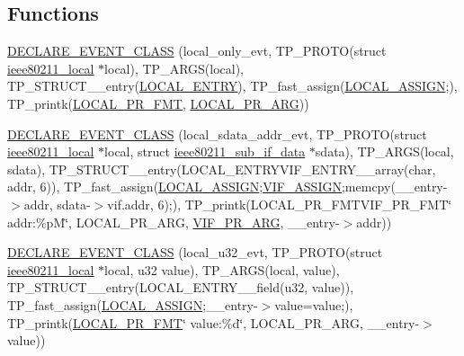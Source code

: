 \subsection*{Functions}
\begin{DoxyCompactItemize}
\item 
\hyperlink{driver-trace_8h_a8e4625fa1c8f4b327f53426b64b498f2}{D\-E\-C\-L\-A\-R\-E\-\_\-\-E\-V\-E\-N\-T\-\_\-\-C\-L\-A\-S\-S} (local\-\_\-only\-\_\-evt, T\-P\-\_\-\-P\-R\-O\-T\-O(struct \hyperlink{structieee80211__local}{ieee80211\-\_\-local} $\ast$local), T\-P\-\_\-\-A\-R\-G\-S(local), T\-P\-\_\-\-S\-T\-R\-U\-C\-T\-\_\-\-\_\-entry(\hyperlink{driver-trace_8h_a70464a6fcf42a8540b6e5b4b5530437f}{L\-O\-C\-A\-L\-\_\-\-E\-N\-T\-R\-Y}), T\-P\-\_\-fast\-\_\-assign(\hyperlink{driver-trace_8h_ab19d9141887ea92ef9640df06a51e0a1}{L\-O\-C\-A\-L\-\_\-\-A\-S\-S\-I\-G\-N};), T\-P\-\_\-printk(\hyperlink{driver-trace_8h_a09833af423135e21ffe99a59ae088cf1}{L\-O\-C\-A\-L\-\_\-\-P\-R\-\_\-\-F\-M\-T}, \hyperlink{driver-trace_8h_aa2a77a17621ecb4f0b3926fec90a5538}{L\-O\-C\-A\-L\-\_\-\-P\-R\-\_\-\-A\-R\-G}))
\item 
\hyperlink{driver-trace_8h_a0aa98c54ec31af8ffe950121705a2629}{D\-E\-C\-L\-A\-R\-E\-\_\-\-E\-V\-E\-N\-T\-\_\-\-C\-L\-A\-S\-S} (local\-\_\-sdata\-\_\-addr\-\_\-evt, T\-P\-\_\-\-P\-R\-O\-T\-O(struct \hyperlink{structieee80211__local}{ieee80211\-\_\-local} $\ast$local, struct \hyperlink{structieee80211__sub__if__data}{ieee80211\-\_\-sub\-\_\-if\-\_\-data} $\ast$sdata), T\-P\-\_\-\-A\-R\-G\-S(local, sdata), T\-P\-\_\-\-S\-T\-R\-U\-C\-T\-\_\-\-\_\-entry(L\-O\-C\-A\-L\-\_\-\-E\-N\-T\-R\-Y\-V\-I\-F\-\_\-\-E\-N\-T\-R\-Y\-\_\-\-\_\-array(char, addr, 6)), T\-P\-\_\-fast\-\_\-assign(\hyperlink{driver-trace_8h_ab19d9141887ea92ef9640df06a51e0a1}{L\-O\-C\-A\-L\-\_\-\-A\-S\-S\-I\-G\-N};\hyperlink{driver-trace_8h_af5ede80f04ffcb3f644f68837b1d252c}{V\-I\-F\-\_\-\-A\-S\-S\-I\-G\-N};memcpy(\-\_\-\-\_\-entry-\/$>$addr, sdata-\/$>$vif.\-addr, 6);), T\-P\-\_\-printk(L\-O\-C\-A\-L\-\_\-\-P\-R\-\_\-\-F\-M\-T\-V\-I\-F\-\_\-\-P\-R\-\_\-\-F\-M\-T\char`\"{} addr\-:\%p\-M\char`\"{}, L\-O\-C\-A\-L\-\_\-\-P\-R\-\_\-\-A\-R\-G, \hyperlink{driver-trace_8h_a12c9f3afcd1c461f7ae2f86fd8503977}{V\-I\-F\-\_\-\-P\-R\-\_\-\-A\-R\-G}, \-\_\-\-\_\-entry-\/$>$addr))
\item 
\hyperlink{driver-trace_8h_a26030c762c752b1ac47c3f6933f19730}{D\-E\-C\-L\-A\-R\-E\-\_\-\-E\-V\-E\-N\-T\-\_\-\-C\-L\-A\-S\-S} (local\-\_\-u32\-\_\-evt, T\-P\-\_\-\-P\-R\-O\-T\-O(struct \hyperlink{structieee80211__local}{ieee80211\-\_\-local} $\ast$local, u32 value), T\-P\-\_\-\-A\-R\-G\-S(local, value), T\-P\-\_\-\-S\-T\-R\-U\-C\-T\-\_\-\-\_\-entry(L\-O\-C\-A\-L\-\_\-\-E\-N\-T\-R\-Y\-\_\-\-\_\-field(u32, value)), T\-P\-\_\-fast\-\_\-assign(\hyperlink{driver-trace_8h_ab19d9141887ea92ef9640df06a51e0a1}{L\-O\-C\-A\-L\-\_\-\-A\-S\-S\-I\-G\-N};\-\_\-\-\_\-entry-\/$>$value=value;), T\-P\-\_\-printk(\hyperlink{driver-trace_8h_a09833af423135e21ffe99a59ae088cf1}{L\-O\-C\-A\-L\-\_\-\-P\-R\-\_\-\-F\-M\-T}\char`\"{} value\-:\%d\char`\"{}, L\-O\-C\-A\-L\-\_\-\-P\-R\-\_\-\-A\-R\-G, \-\_\-\-\_\-entry-\/$>$value))

\end{DoxyCompactItemize}
